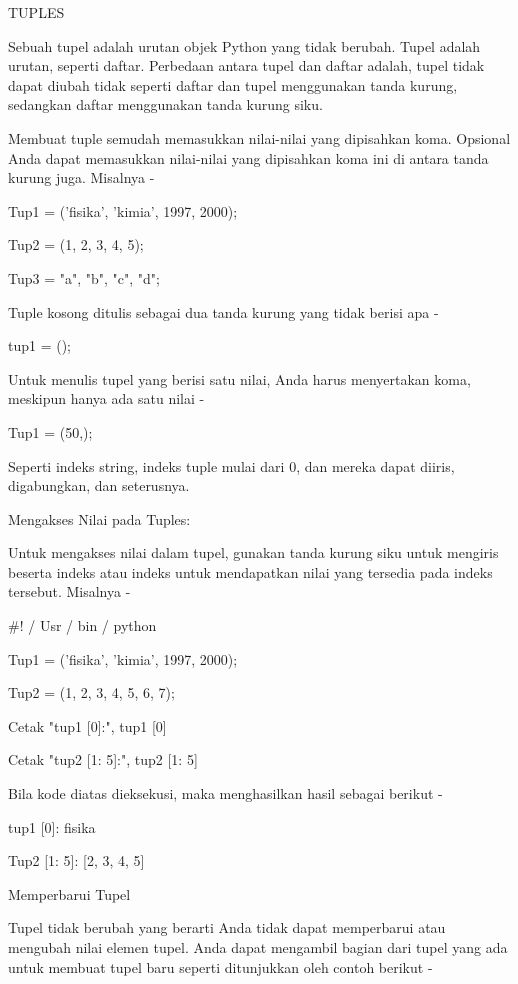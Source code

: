 

TUPLES \par
Sebuah tupel adalah urutan objek Python yang tidak berubah. Tupel adalah urutan, seperti daftar. Perbedaan antara tupel dan daftar adalah, tupel tidak dapat diubah tidak seperti daftar dan tupel menggunakan tanda kurung, sedangkan daftar menggunakan tanda kurung siku. \par
Membuat tuple semudah memasukkan nilai-nilai yang dipisahkan koma. Opsional Anda dapat memasukkan nilai-nilai yang dipisahkan koma ini di antara tanda kurung juga. Misalnya - \par
\vspace{12pt}
Tup1 = ('fisika', 'kimia', 1997, 2000); \par
Tup2 = (1, 2, 3, 4, 5); \par
Tup3 = "a", "b", "c", "d"; \par
Tuple kosong ditulis sebagai dua tanda kurung yang tidak berisi apa - \par
tup1 = (); \par
Untuk menulis tupel yang berisi satu nilai, Anda harus menyertakan koma, meskipun hanya ada satu nilai - \par
Tup1 = (50,); \par
Seperti indeks string, indeks tuple mulai dari 0, dan mereka dapat diiris, digabungkan, dan seterusnya. \par
Mengakses Nilai pada Tuples: \par
Untuk mengakses nilai dalam tupel, gunakan tanda kurung siku untuk mengiris beserta indeks atau indeks untuk mendapatkan nilai yang tersedia pada indeks tersebut. Misalnya - \par
 $  \#  $! / Usr / bin / python \par
\vspace{12pt}
Tup1 = ('fisika', 'kimia', 1997, 2000); \par
Tup2 = (1, 2, 3, 4, 5, 6, 7); \par
\vspace{12pt}
Cetak "tup1 [0]:", tup1 [0] \par
Cetak "tup2 [1: 5]:", tup2 [1: 5] \par
Bila kode diatas dieksekusi, maka menghasilkan hasil sebagai berikut - \par
tup1 [0]: fisika \par
Tup2 [1: 5]: [2, 3, 4, 5] \par
Memperbarui Tupel \par
Tupel tidak berubah yang berarti Anda tidak dapat memperbarui atau mengubah nilai elemen tupel. Anda dapat mengambil bagian dari tupel yang ada untuk membuat tupel baru seperti ditunjukkan oleh contoh berikut - \par
